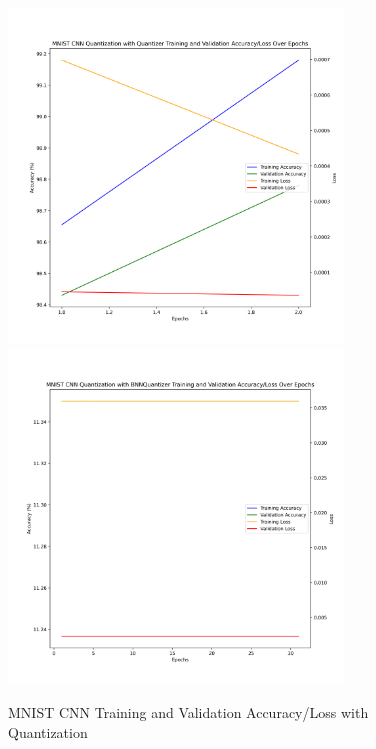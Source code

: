 \documentclass{article}
\begin{document}
\begin{figure}
    \centerline{\includegraphics[width=3.5in]{../proj2/figures/mnist_cnn_QAT_Quantizer.png}\includegraphics[width=3.5in]{../proj2/figures/mnist_cnn_BNNQuantizer.png}}
    \caption{MNIST CNN Training and Validation Accuracy/Loss with Quantization}
    \label{fig:mnist-charts}
\end{figure}
\end{document}

